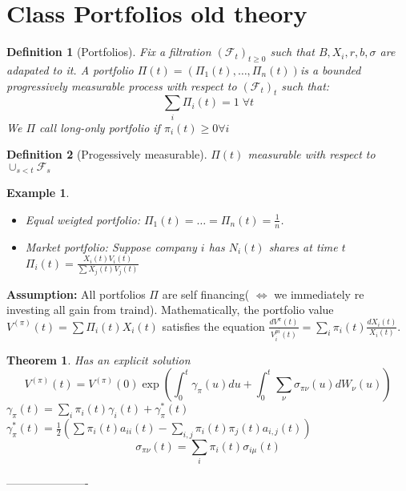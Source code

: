 \documentclass{article} \usepackage[utf8]{inputenc}
\newtheorem{theorem}{Theorem}
\newtheorem{definition}{Definition}
\newtheorem{example}{Example}
\newenvironment{class}[1]
{\section{Class #1}}
{ ----------------------}
\begin{document}
\begin{class}{Portfolios old theory}
  
  \begin{definition}[Portfolios]
    Fix a filtration $(\mathcal F_t)_{t \ge 0}$ such that $B, X_i, r, b, \sigma$ are adapated to it.
    A portfolio $\Pi(t) = (\Pi_1(t), \ldots, \Pi_n(t))$is a bounded progressively measurable process with respect to $(\mathcal F_t)_t$ such that:
    $$\sum_i \Pi_i(t) = 1 \; \forall t$$
    We $\Pi$ call long-only portfolio if $\pi_i(t) \ge 0 \forall i$ 
  \end{definition}

\begin{definition}[Progessively measurable]
  $\Pi(t)$ measurable with respect to $\cup_{s < t} \mathcal F_s$
\end{definition}
\begin{example}
  \begin{itemize}
  \item Equal weigted portfolio: $\Pi_1(t) = \ldots = \Pi_n(t) = \frac1n$.
  \item Market portfolio: Suppose company $i$ has $N_i(t)$ shares at time $t$
    $\Pi_i(t) = \frac{X_i(t)V_i(t)}{\sum X_j(t)V_j(t)}$
  \end{itemize}
\end{example}

\textbf{Assumption:} All portfolios $\Pi$ are self financing( $\iff$ we immediately re investing all gain from traind).
Mathematically, the portfolio value $V^{(\pi)}(t) = \sum \Pi_i(t) X_i(t)$ satisfies the equation $\frac{dV^{\pi}(t)}{V_i^{pi}(t)} = \sum_{i} \pi_i(t) \frac{dX_i(t)}{X_i(t)}$.
\begin{theorem}
  Has an explicit solution
  $$V^{(\pi)}(t) = V^{(\pi)}(0) \exp( \int_0^t \gamma_{\pi}(u)du + \int_0^t \sum_{\nu} \sigma_{\pi\nu}(u)dW_{\nu}(u))$$
  $\gamma_\pi(t) = \sum_i \pi_i(t) \gamma_i(t) + \gamma_{\pi}^*(t)$
  $\gamma_{\pi}^*(t) = \frac12 (\sum \pi_i(t) a_{ii}(t) - \sum_{i, j} \pi_i(t)\pi_j(t)a_{i,j}(t))$
  $$\sigma_{\pi\nu}(t) = \sum_i \pi_i(t)\sigma_{i\mu}(t)$$
\end{theorem}
\end{class}
\end{document}
